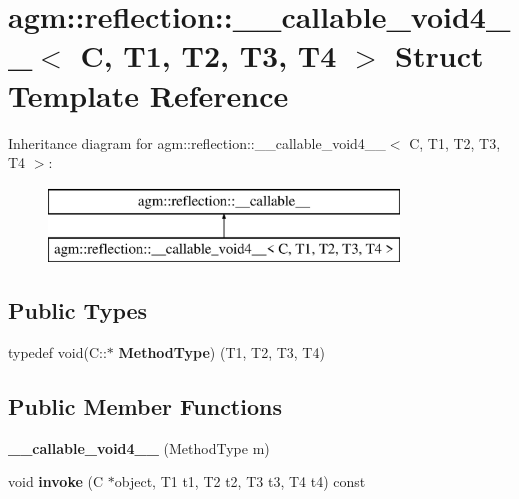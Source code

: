 \hypertarget{structagm_1_1reflection_1_1____callable__void4____}{}\section{agm\+:\+:reflection\+:\+:\+\_\+\+\_\+callable\+\_\+void4\+\_\+\+\_\+$<$ C, T1, T2, T3, T4 $>$ Struct Template Reference}
\label{structagm_1_1reflection_1_1____callable__void4____}
Inheritance diagram for agm\+:\+:reflection\+:\+:\+\_\+\+\_\+callable\+\_\+void4\+\_\+\+\_\+$<$ C, T1, T2, T3, T4 $>$\+:\begin{figure}[H]
\begin{center}
\leavevmode
\includegraphics[height=2.000000cm]{structagm_1_1reflection_1_1____callable__void4____}
\end{center}
\end{figure}
\subsection*{Public Types}
\begin{DoxyCompactItemize}
\item 
typedef void(C\+::$\ast$ {\bfseries Method\+Type}) (T1, T2, T3, T4)\hypertarget{structagm_1_1reflection_1_1____callable__void4_____ab2d1e68a707444c836f75566ba4c21a2}{}\label{structagm_1_1reflection_1_1____callable__void4_____ab2d1e68a707444c836f75566ba4c21a2}

\end{DoxyCompactItemize}
\subsection*{Public Member Functions}
\begin{DoxyCompactItemize}
\item 
{\bfseries \+\_\+\+\_\+callable\+\_\+void4\+\_\+\+\_\+} (Method\+Type m)\hypertarget{structagm_1_1reflection_1_1____callable__void4_____a2b8e53e14ada28177ddff2a6658238e7}{}\label{structagm_1_1reflection_1_1____callable__void4_____a2b8e53e14ada28177ddff2a6658238e7}

\item 
void {\bfseries invoke} (C $\ast$object, T1 t1, T2 t2, T3 t3, T4 t4) const \hypertarget{structagm_1_1reflection_1_1____callable__void4_____ad8fa1d2b2ca693961c4a32b2fc00cc71}{}\label{structagm_1_1reflection_1_1____callable__void4_____ad8fa1d2b2ca693961c4a32b2fc00cc71}

\end{DoxyCompactItemize}
